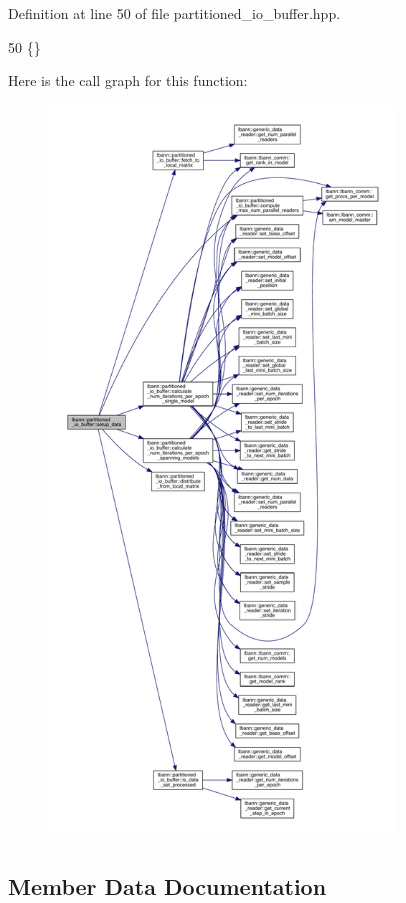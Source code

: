 Definition at line 50 of file partitioned\+\_\+io\+\_\+buffer.\+hpp.


\begin{DoxyCode}
50 \{\}
\end{DoxyCode}
Here is the call graph for this function\+:\nopagebreak
\begin{figure}[H]
\begin{center}
\leavevmode
\includegraphics[height=550pt]{classlbann_1_1partitioned__io__buffer_a06a204fbf82f092b0225ab10c1bec98e_cgraph}
\end{center}
\end{figure}


\subsection{Member Data Documentation}
\mbox{\label{classlbann_1_1partitioned__io__buffer_a80d8916c269b26e605637353abe322b2}} 
